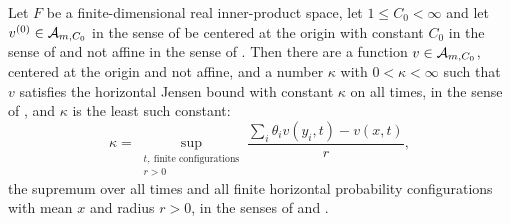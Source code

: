 \begin{lemma}
Let $F$ be a finite-dimensional real inner-product space, let $1\le C_0<\infty$
and let $v^{(0)}\in\mathcal{A}_{m,C_0}$ in the sense of  be
centered at the origin with constant $C_0$ in the sense of
 and not affine in the sense of
. Then there are a function
$v\in\mathcal{A}_{m,C_0}$, centered at the origin and not affine, and a number
$\kappa$ with $0<\kappa<\infty$ such that $v$ satisfies the horizontal Jensen
bound with constant $\kappa$ on all times, in the sense of
, and $\kappa$ is the least such constant:
\[
  \kappa=\sup_{\substack{t,\ \text{finite configurations}\\r>0}}
     \frac{\sum_i\theta_i v(y_i,t)-v(x,t)}{r},
\]
the supremum over all times and all finite horizontal probability configurations
with mean $x$ and radius $r>0$, in the senses of  and
.
\end{lemma}
